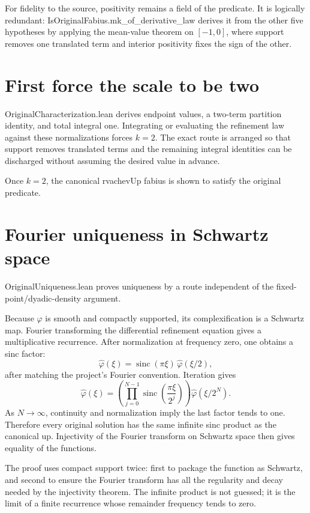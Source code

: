 \documentclass[11pt,a4paper,openany]{book}
\def\module#1{#1.lean}
\def\decl#1{#1}
\def\upfun{up}
\newcommand{\upfun}{\ensuremath{\operatorname{up}}}
\newcommand{\module}[1]{\nolinkurl{#1.lean}}
\newcommand{\decl}[1]{\texttt{\detokenize{#1}}}
\begin{document}
For fidelity to the source, positivity remains a field of the predicate.  It is
logically redundant: \decl{IsOriginalFabius.mk_of_derivative_law} derives it
from the other five hypotheses by applying the mean-value theorem on
$[-1,0]$, where support removes one translated term and interior positivity
fixes the sign of the other.

\section{First force the scale to be two}
\module{OriginalCharacterization} derives endpoint values, a two-term partition
identity, and total integral one.  Integrating or evaluating the refinement
law against these normalizations forces $k=2$.  The exact route is arranged so
that support removes translated terms and the remaining integral identities
can be discharged without assuming the desired value in advance.

Once $k=2$, the canonical \decl{rvachevUp fabius} is shown to satisfy the
original predicate.

\section{Fourier uniqueness in Schwartz space}
\module{OriginalUniqueness} proves uniqueness by a route independent of the
fixed-point/dyadic-density argument.

Because $\varphi$ is smooth and compactly supported, its complexification is a
Schwartz map.  Fourier transforming the differential refinement equation gives
a multiplicative recurrence.  After normalization at frequency zero, one
obtains a sinc factor:
\[
 \widehat\varphi(\xi)
   =\operatorname{sinc}(\pi\xi)\,
      \widehat\varphi(\xi/2),
\]
after matching the project's Fourier convention.  Iteration gives
\[
 \widehat\varphi(\xi)=
   \left(\prod_{j=0}^{N-1}
      \operatorname{sinc}\!\left(\frac{\pi\xi}{2^j}\right)\right)
   \widehat\varphi(\xi/2^N).
\]
As $N\to\infty$, continuity and normalization imply the last factor tends to
one.  Therefore every original solution has the same infinite sinc product as
the canonical \upfun.  Injectivity of the Fourier transform on Schwartz space
then gives equality of the functions.

\begin{proofidea}
The proof uses compact support twice: first to package the function as Schwartz,
and second to ensure the Fourier transform has all the regularity and decay
needed by the injectivity theorem.  The infinite product is not guessed; it is
the limit of a finite recurrence whose remainder frequency tends to zero.
\end{proofidea}
\end{document}
